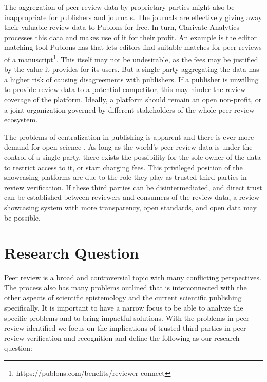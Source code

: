 The aggregation of peer review data by proprietary parties might also be inappropriate for publishers and journals. The journals are effectively giving away their valuable review data to Publons for free. In turn, Clarivate Analytics processes this data and makes use of it for their profit. An example is the editor matching tool Publons has that lets editors find suitable matches for peer reviews of a manuscript\footnote{https://publons.com/benefits/reviewer-connect}. This itself may not be undesirable, as the fees may be justified by the value it provides for its users. But a single party aggregating the data has a higher risk of causing disagreements with publishers. If a publisher is unwilling to provide review data to a potential competitor, this may hinder the review coverage of the platform. Ideally, a platform should remain an open non-profit, or a joint organization governed by different stakeholders of the whole peer review ecosystem.

The problems of centralization in publishing is apparent \parencite{Lariviere.2015} and there is ever more demand for open science \parencite[1-3]{Piwowar.2018}. As long as the world’s peer review data is under the control of a single party, there exists the possibility for the sole owner of the data to restrict access to it, or start charging fees. This privileged position of the showcasing platforms are due to the role they play as trusted third parties in review verification. If these third parties can be disintermediated, and direct trust can be established between reviewers and consumers of the review data, a review showcasing system with more transparency, open standards, and open data may be possible.

\section{Research Question}

Peer review is a broad and controversial topic with many conflicting perspectives. The process also has many problems outlined that is interconnected with the other aspects of scientific epistemology and the current scientific publishing specifically. It is important to have a narrow focus to be able to analyze the specific problems and to bring impactful solutions. With the problems in peer review identified we focus on the implications of trusted third-parties in peer review verification and recognition and define the following as our research question: \\ 

